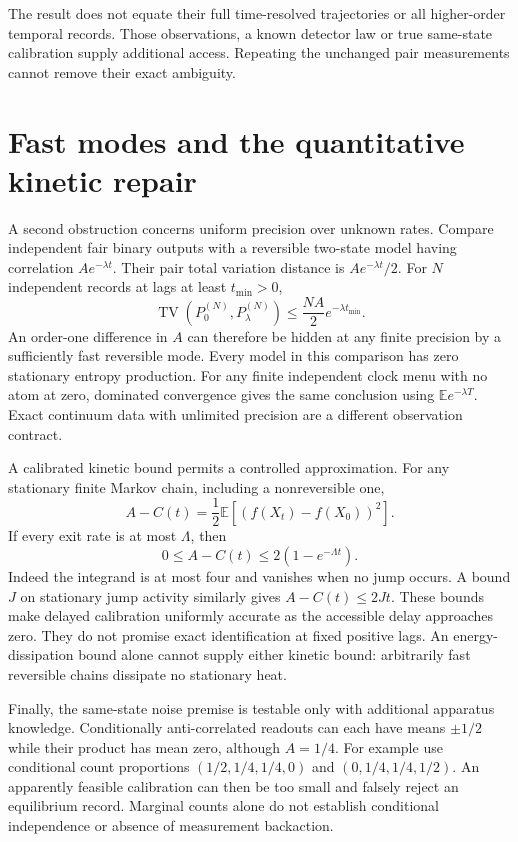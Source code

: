The result does not equate their full time-resolved trajectories or all
higher-order temporal records. Those observations, a known detector law or
true same-state calibration supply additional access. Repeating the unchanged
pair measurements cannot remove their exact ambiguity.

\section{Fast modes and the quantitative kinetic repair}
A second obstruction concerns uniform precision over unknown rates. Compare
independent fair binary outputs with a reversible two-state model having
correlation $Ae^{-\lambda t}$. Their pair total variation distance is
$Ae^{-\lambda t}/2$. For $N$ independent records at lags at least $t_{\min}>0$,
\begin{equation}
 \operatorname{TV}(P_0^{(N)},P_\lambda^{(N)})
 \leq\frac{NA}{2}e^{-\lambda t_{\min}}.
 \label{eq:ci-fast-mode}
\end{equation}
An order-one difference in $A$ can therefore be hidden at any finite precision
by a sufficiently fast reversible mode. Every model in this comparison has
zero stationary entropy production. For any finite independent clock menu with
no atom at zero, dominated convergence gives the same conclusion using
$\mathbb E e^{-\lambda T}$. Exact continuum data with unlimited precision are
a different observation contract.

A calibrated kinetic bound permits a controlled approximation. For any stationary
finite Markov chain, including a nonreversible one,
\begin{equation}
 A-C(t)=\frac12\mathbb E[(f(X_t)-f(X_0))^2].
\end{equation}
If every exit rate is at most $\Lambda$, then
\begin{equation}
 0\leq A-C(t)\leq2(1-e^{-\Lambda t}).
 \label{eq:ci-rate-repair}
\end{equation}
Indeed the integrand is at most four and vanishes when no jump occurs.
A bound $J$ on stationary jump activity similarly gives $A-C(t)\leq2Jt$.
These bounds make delayed calibration uniformly accurate as the accessible
delay approaches zero. They do not promise exact identification at fixed
positive lags. An energy-dissipation bound alone cannot supply either kinetic
bound: arbitrarily fast reversible chains dissipate no stationary heat.

Finally, the same-state noise premise is testable only with additional apparatus
knowledge. Conditionally anti-correlated readouts can each have means
$\pm1/2$ while their product has mean zero, although $A=1/4$. For example use
conditional count proportions $(1/2,1/4,1/4,0)$ and
$(0,1/4,1/4,1/2)$. An apparently feasible calibration can then be too small and
falsely reject an equilibrium record. Marginal counts alone do not establish
conditional independence or absence of measurement backaction.

